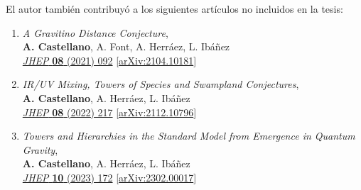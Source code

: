El autor también contribuyó a los siguientes artículos no incluidos en la tesis:

\begin{enumerate}
\item[{\hypersetup{hidelinks}\cite{Castellano:2021yye}}]{\emph{A Gravitino Distance Conjecture},\\
\textbf{A. Castellano}, A. Font, A. Herr\'aez, L. Ib\'añez\\
\href{https://link.springer.com/article/10.1007/JHEP08(2021)092}{\emph{JHEP} \textbf{08} (2021) 092} 
[\href{https://arxiv.org/abs/2104.10181}{arXiv:2104.10181}]}

\item[{\hypersetup{hidelinks}\cite{Castellano:2021mmx}}]{\emph{IR/UV Mixing, Towers of Species and Swampland Conjectures},\\
\textbf{A. Castellano}, A. Herr\'aez, L. Ib\'añez\\
\href{https://link.springer.com/article/10.1007/JHEP08(2022)217}{\emph{JHEP} \textbf{08} (2022) 217} 
[\href{https://arxiv.org/abs/2112.10796}{arXiv:2112.10796}]}

\item[{\hypersetup{hidelinks}\cite{Castellano:2023qhp}}]{\emph{Towers and Hierarchies in the Standard Model from Emergence in Quantum Gravity},\\
\textbf{A. Castellano}, A. Herr\'aez, L. Ib\'añez\\
\href{https://link.springer.com/article/10.1007/JHEP10(2023)172}{\emph{JHEP} \textbf{10} (2023) 172} 
[\href{https://arxiv.org/abs/2302.00017}{arXiv:2302.00017}]}

\end{enumerate}





























